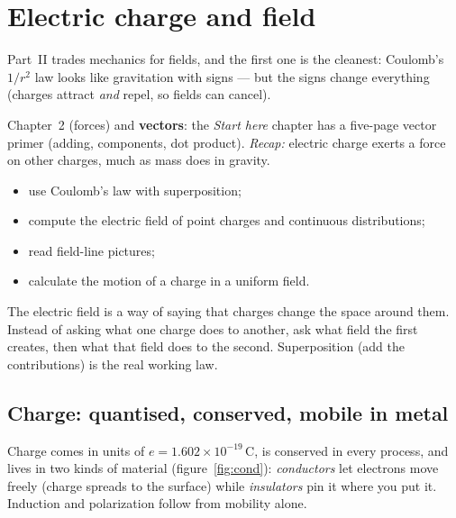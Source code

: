 \chapter{Electric charge and field}\label{ch:efield}

Part~II trades mechanics for fields, and the first one is the cleanest:
Coulomb's $1/r^{2}$ law looks like gravitation with signs --- but the
signs change everything (charges attract \emph{and} repel, so fields can
cancel).

\begin{rulebox}
Chapter~2 (forces) and \textbf{vectors}: the \emph{Start here} chapter has a five-page vector primer (adding, components, dot product). \emph{Recap:} electric charge exerts a force on other charges, much as mass does in gravity.
\end{rulebox}
\begin{wins}
\begin{itemize}
\item use Coulomb's law with superposition;
\item compute the electric field of point charges and continuous distributions;
\item read field-line pictures;
\item calculate the motion of a charge in a uniform field.
\end{itemize}
\end{wins}
\begin{principle}
The electric field is a way of saying that charges change the space around them. Instead of asking what one charge does to another, ask what field the first creates, then what that field does to the second. Superposition (add the contributions) is the real working law.
\end{principle}

\section{Charge: quantised, conserved, mobile in metal}\label{sec:ef-charge}

Charge comes in units of $e=1.602\times10^{-19}$\,C, is conserved in
every process, and lives in two kinds of material
(figure~\ref{fig:cond}): \emph{conductors} let electrons move freely
(charge spreads to the surface) while \emph{insulators} pin it where you
put it. Induction and polarization follow from mobility alone.

